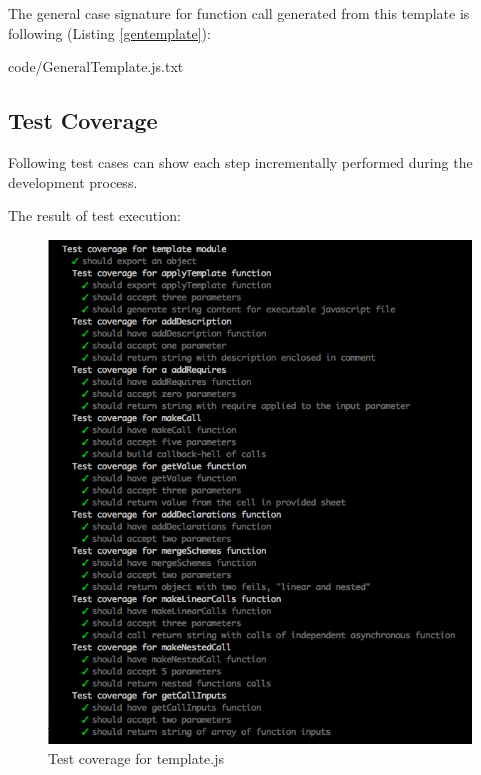 {The general case signature for function call generated from this template is following (Listing \ref{gentemplate}):

{code/GeneralTemplate.js.txt}

\subsection{Test Coverage}
Following test cases can show each step incrementally performed during the development process.

%

The result of test execution:
\begin{figure}[H]
	\centering
	\includegraphics[width=\linewidth]{grafiken/testTemplate.png}
	\caption{Test coverage for template.js}
	\label{fig:testTemplate}
\end{figure}

}
